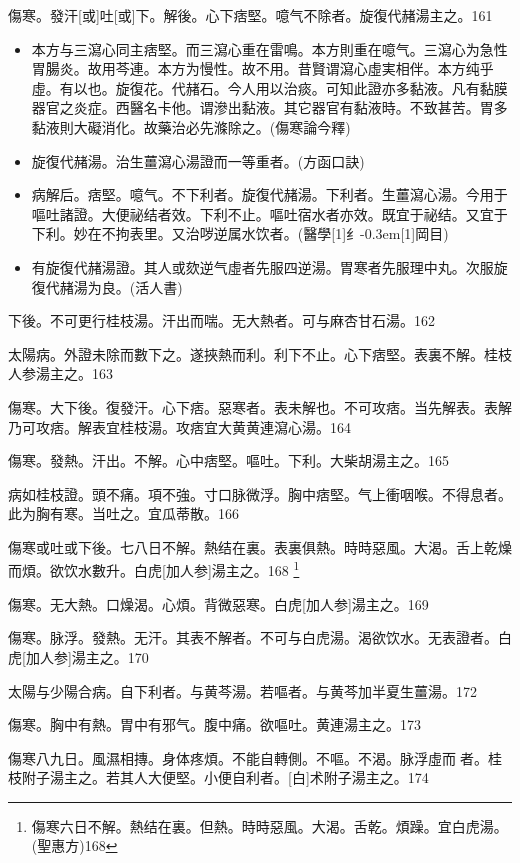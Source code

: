 \documentclass[11pt,oneside,b5paper]{ctexbook}
\begin{document}
\begin{flushleft}
傷寒。發汗[或]吐[或]下。解後。心下痞堅。噫气不除者。旋復代赭湯主之。161

\begin{itemize}
\item 本方与三瀉心同主痞堅。而三瀉心重在雷鳴。本方則重在噫气。三瀉心为急性胃腸炎。故用芩連。本方为慢性。故不用。昔賢谓瀉心虛実相伴。本方纯乎虛。有以也。旋復花。代赭石。今人用以治痰。可知此證亦多黏液。凡有黏膜器官之炎症。西醫名卡他。谓滲出黏液。其它器官有黏液時。不致甚苦。胃多黏液則大礙消化。故藥治必先滌除之。(傷寒論今釋)
\item 旋復代赭湯。治生薑瀉心湯證而一等重者。(方函口訣)
\item 病解后。痞堅。噫气。不下利者。旋復代赭湯。下利者。生薑瀉心湯。今用于嘔吐諸證。大便祕结者效。下利不止。嘔吐宿水者亦效。既宜于祕结。又宜于下利。妙在不拘表里。又治哕逆属水饮者。(醫學{\hbox{\scalebox{0.6}[1]{纟}\kern-0.3em\scalebox{0.63}[1]{岡}}}目)
\item 有旋復代赭湯證。其人或欬逆气虛者先服四逆湯。胃寒者先服理中丸。次服旋復代赭湯为良。(活人書)
\end{itemize}

下後。不可更行桂枝湯。汗出而喘。无大熱者。可与麻杏甘石湯。162

太陽病。外證未除而數下之。遂挾熱而利。利下不止。心下痞堅。表裏不解。桂枝人参湯主之。163

傷寒。大下後。復發汗。心下痞。惡寒者。表未解也。不可攻痞。当先解表。表解乃可攻痞。解表宜桂枝湯。攻痞宜大黄黄連瀉心湯。164

傷寒。發熱。汗出。不解。心中痞堅。嘔吐。下利。大柴胡湯主之。165

病如桂枝證。頭不痛。項不強。寸口脉微浮。胸中痞堅。气上衝咽喉。不得息者。此为胸有寒。当吐之。宜瓜蒂散。166

傷寒或吐或下後。七八日不解。熱结在裏。表裏俱熱。時時惡風。大渴。舌上乾燥而煩。欲饮水數升。白虎[加人参]湯主之。168
\footnote{傷寒六日不解。熱结在裏。但熱。時時惡風。大渴。舌乾。煩躁。宜白虎湯。(聖惠方)168}

傷寒。无大熱。口燥渴。心煩。背微惡寒。白虎[加人参]湯主之。169

傷寒。脉浮。發熱。无汗。其表不解者。不可与白虎湯。渴欲饮水。无表證者。白虎[加人参]湯主之。170

太陽与少陽合病。自下利者。与黄芩湯。若嘔者。与黄芩加半夏生薑湯。172

傷寒。胸中有熱。胃中有邪气。腹中痛。欲嘔吐。黄連湯主之。173

傷寒八九日。風濕相摶。身体疼煩。不能自轉側。不嘔。不渴。脉浮虛而{𬈧}者。桂枝附子湯主之。若其人大便堅。小便自利者。[白]术附子湯主之。174


\end{flushleft}
\end{document}
